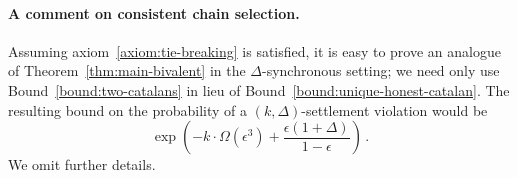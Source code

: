     \paragraph{A comment on consistent chain selection.} 
    Assuming axiom~\ref{axiom:tie-breaking} is satisfied, 
    it is easy to prove an analogue of Theorem~\ref{thm:main-bivalent} 
    in the $\Delta$-synchronous setting; 
    we need only use Bound~\ref{bound:two-catalans} 
    in lieu of Bound~\ref{bound:unique-honest-catalan}. 
    The resulting bound on the probability of a $(k, \Delta)$-settlement violation would be 
    $$
      \exp\left( 
        -k\cdot \Omega(\epsilon^3) 
        + 
        \frac{\epsilon(1+\Delta)}{1 - \epsilon} 
      \right)
      \,.
    $$
    We omit further details.


